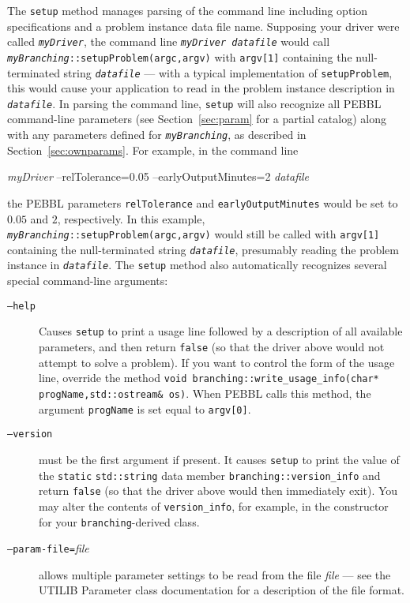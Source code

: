The \texttt{setup} method manages parsing of the command line
including option specifications and a problem instance data file name.
Supposing your driver were called \texttt{\emph{myDriver}}, the
command line \texttt{\emph{myDriver} \emph{datafile}} 
would call \texttt{\emph{myBranching}::setupProblem(argc,argv)} with
\texttt{argv[1]} containing the null-terminated string
\texttt{\emph{datafile}} --- with a typical implementation of
\texttt{setupProblem}, this would cause your application to read in
the problem instance description in \texttt{\emph{datafile}}.
In parsing the command line, \texttt{setup} will also recognize all PEBBL
command-line parameters (see Section~\ref{sec:param} for a partial
catalog) along with any parameters defined for
\texttt{\emph{myBranching}}, as described in
Section~\ref{sec:ownparams}.  For example, in the command line
\begin{codeblock}
\emph{myDriver} --relTolerance=0.05 --earlyOutputMinutes=2 \emph{datafile}
\end{codeblock}
the PEBBL parameters \texttt{relTolerance} and
\texttt{earlyOutputMinutes} would be set to $0.05$ and $2$,
respectively.  In this example,
\texttt{\emph{myBranching}::setupProblem(argc,argv)} would still be
called with \texttt{argv[1]} containing the null-terminated string
\texttt{\emph{datafile}}, presumably reading the problem instance in
\texttt{\emph{datafile}}. 
The \texttt{setup} method also automatically recognizes several
special command-line arguments:
\begin{description}
\item[\texttt{--help}] Causes \texttt{setup} to print a usage line
followed by a description of all available parameters, and then return
\texttt{false} (so that the driver above would not attempt to solve a
problem).  If you want to control the form of the usage line, override
the method \texttt{void branching::write\_usage\_info(char*
  progName,std::ostream\& os)}.  When PEBBL calls this method, the
argument \texttt{progName} is set equal to \texttt{argv[0]}.
\item[\texttt{--version}] must be the first argument if present.  It
  causes \texttt{setup} to print the value of the \texttt{static}
  \texttt{std::string} data member \texttt{branching::version\_info} and return
  \texttt{false} (so that the driver above would then immediately
  exit).  You may alter the contents of \texttt{version\_info}, for
  example, in the constructor for your \texttt{branching}-derived
  class.
\item[\texttt{--param-file=}\textmd{\emph{file}}] allows multiple parameter
  settings to be read from the file \emph{file} --- see the UTILIB
  Parameter class documentation for a description of the file format.
\end{description}

